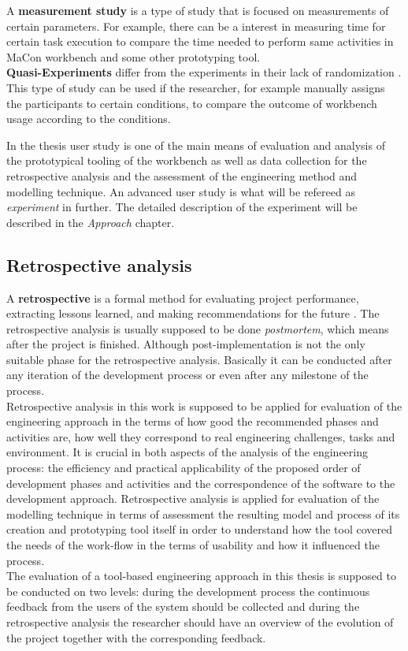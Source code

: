 A \textbf{measurement study} is a type of study that is focused on measurements of certain parameters. For example, there can be a interest in measuring time for certain task execution to compare the time needed to perform same activities in MaCon workbench and some other prototyping tool.\\ 

\textbf{Quasi-Experiments} differ from the experiments in their lack of randomization \cite{leroy}. This type of study can be used if the researcher, for example manually assigns the participants to certain conditions, to compare the outcome of workbench usage according to the conditions. 

In the thesis user study is one of the main means of evaluation and analysis of the prototypical tooling of the workbench as well as data collection for the retrospective analysis and the assessment of the engineering method and modelling technique. An advanced user study is what will be refereed as \textit{experiment} in further. The detailed description of the experiment will be described in the \textit{Approach} chapter.
\subsection{Retrospective analysis}\label{subsection:retrospective}

A \textbf{retrospective} is a formal method for evaluating project performance, extracting lessons learned, and making recommendations for the future \cite{nelson}. The retrospective analysis is usually supposed to be done \textit{postmortem}, which means after the project is finished. Although post-implementation is not the only suitable phase for the retrospective analysis. Basically it can be conducted after any iteration of the development process or even after any milestone of the process.\\ 

Retrospective analysis in this work is supposed to be applied for evaluation of the engineering approach in the terms of how good the recommended phases and activities are, how well they correspond to real engineering challenges, tasks and environment. It is crucial in both aspects of the analysis of the engineering process: the efficiency and practical applicability of the proposed order of development phases and activities and the correspondence of the software to the development approach. Retrospective analysis is applied for evaluation of the modelling technique in terms of assessment the resulting model and process of its creation and prototyping tool itself in order to understand how the tool covered the needs of the work-flow in the terms of usability and how it influenced the process.\\

The evaluation of a tool-based engineering approach in this thesis is supposed to be conducted on two levels: during the development process the continuous feedback from the users of the system should be collected and during the retrospective analysis the researcher should have an overview of the evolution of the project together with the corresponding feedback.